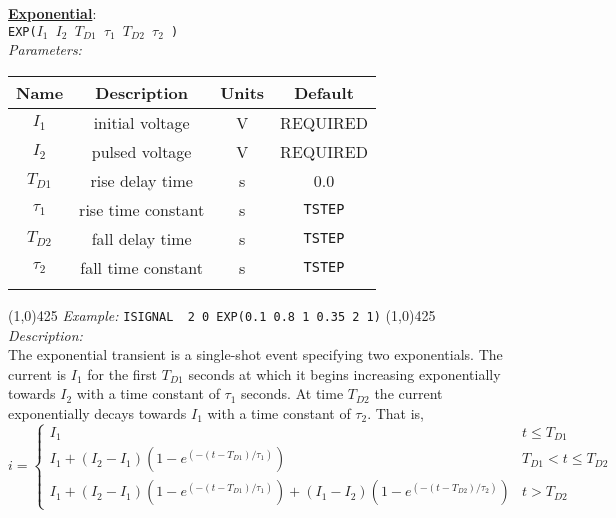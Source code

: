 \underline{\bf{Exponential}}:\\
\texttt{EXP($I_1$ $I_2$ \B $T_{D1}$ \E \B $\tau_1$ \E
       \B $T_{D2}$ \E \B$\tau_2$ \E)}\\
\textit{Parameters:}
\begin{table}[h]
\begin{tabular}{|c|c|c|c|}
\hline
Name&Description&Units&Default\\
\hline
$I_1$& initial voltage & V & \scriptsize{REQUIRED}\\
\hline
$I_2$ & pulsed voltage & V & \scriptsize{REQUIRED}\\
\hline
$T_{D1}$ & rise delay time & s & 0.0\\
\hline
$\tau_1$ & rise time constant & s & {\tt TSTEP}\\
\hline
$T_{D2}$ & fall delay time & s & {\tt TSTEP}\\
\hline
$\tau_2$ & fall time constant & s &  {\tt TSTEP}\\
\par
\hline
\end{tabular}
\end{table}
\newline
\linethickness{0.5mm} \line(1,0){425}
\newline
\textit{Example:}
\newline
\texttt{ISIGNAL \ 2\ 0\ EXP(0.1 0.8 1 0.35 2 1)}
\newline
\linethickness{0.5mm} \line(1,0){425}
\newline
\textit{Description:}\\
The exponential transient is a single-shot event specifying two
exponentials. The current is $I_1$ for the first $T_{D1}$ seconds
at which it begins increasing exponentially towards $I_2$ with a
time constant of $\tau_1$ seconds.  At time $T_{D2}$ the current
exponentially decays towards $I_1$ with a time constant of
$\tau_2$. That is,
\begin{equation}
i = \left\{ \begin{array}{ll}
     I_1                                           & t \le T_{D1}\\
     I_1+(I_2-I_1)(1-e^{\textstyle (-(t-T_{D1})/\tau_1)})  & T_{D1} < t \le T_{D2}\\
     I_1+(I_2-I_1)(1-e^{\textstyle (-(t-T_{D1})/\tau_1)})
        +(I_1-I_2)(1-e^{\textstyle (-(t-T_{D2})/\tau_2)})  &  t > T_{D2}
     \end{array} \right. %
\end{equation}
